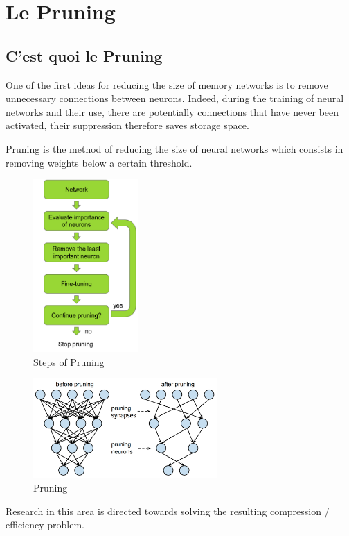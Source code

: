 \documentclass[twoside,twocolumn]{article}
\begin{document}
\section{Le Pruning} %

\subsection{C'est quoi le Pruning}
One of the first ideas for reducing the size of memory networks is to remove unnecessary connections between neurons. Indeed, during the training of neural networks and 
their use, there are potentially connections that have never been activated, their suppression therefore saves storage space.

Pruning is the method of reducing the size of neural networks which consists in removing weights below a certain threshold.

\begin{figure}[h]
  \centering
  \includegraphics[width=40mm]{pruning_steps.png}
  \caption{Steps of Pruning}
  \label{Pruning_step}
\end{figure}

\begin{figure}[h]
  \centering
  \includegraphics[width=70mm]{pruning.png}
  \caption{Pruning}
  \label{pruning of perceptron Multi-Layer perceptron}
\end{figure}
Research in this area is directed towards solving the resulting compression / efficiency problem.
\end{document}
